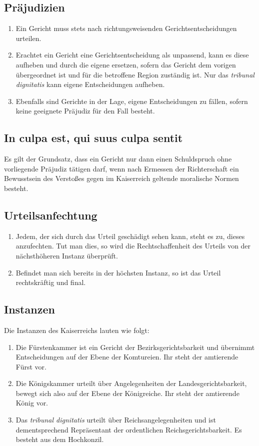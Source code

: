 \documentclass{article}
\begin{document}
\subsection{Präjudizien}
\begin{enumerate}[(1)]
    \item Ein Gericht muss stets nach richtungsweisenden Gerichtsentscheidungen urteilen.
    \item Erachtet ein Gericht eine Gerichtsentscheidung als unpassend, kann es diese aufheben und durch die eigene ersetzen, sofern das Gericht dem vorigen übergeordnet ist und für die betroffene Region zuständig ist. Nur das \textit{tribunal dignitatis} kann eigene Entscheidungen aufheben.
    \item Ebenfalls sind Gerichte in der Lage, eigene Entscheidungen zu fällen, sofern keine geeignete Präjudiz für den Fall besteht.
\end{enumerate}

\subsection{In culpa est, qui suus culpa sentit}
Es gilt der Grundsatz, dass ein Gericht nur dann einen Schuldspruch ohne vorliegende Präjudiz tätigen darf, wenn nach Ermessen der Richterschaft ein Bewusstsein des Verstoßes gegen im Kaiserreich geltende moralische Normen besteht.

\subsection{Urteilsanfechtung}
\begin{enumerate}[(1)]
    \item Jedem, der sich durch das Urteil geschädigt sehen kann, steht es zu, dieses anzufechten. Tut man dies, so wird die Rechtschaffenheit des Urteils von der nächsthöheren Instanz überprüft.
    \item Befindet man sich bereits in der höchsten Instanz, so ist das Urteil rechtskräftig und final.
\end{enumerate}

\subsection{Instanzen}
Die Instanzen des Kaiserreichs lauten wie folgt:
\begin{enumerate}[1.]
    \item Die Fürstenkammer ist ein Gericht der Bezirksgerichtsbarkeit und übernimmt Entscheidungen auf der Ebene der Komtureien. Ihr steht der amtierende Fürst vor.
    \item Die Königskammer urteilt über Angelegenheiten der Landesgerichtsbarkeit, bewegt sich also auf der Ebene der Königreiche. Ihr steht der amtierende König vor.
    \item Das \textit{tribunal dignitatis} urteilt über Reichsangelegenheiten und ist dementsprechend Repräsentant der ordentlichen Reichsgerichtsbarkeit. Es besteht aus dem Hochkonzil.
\end{enumerate}
\end{document}
